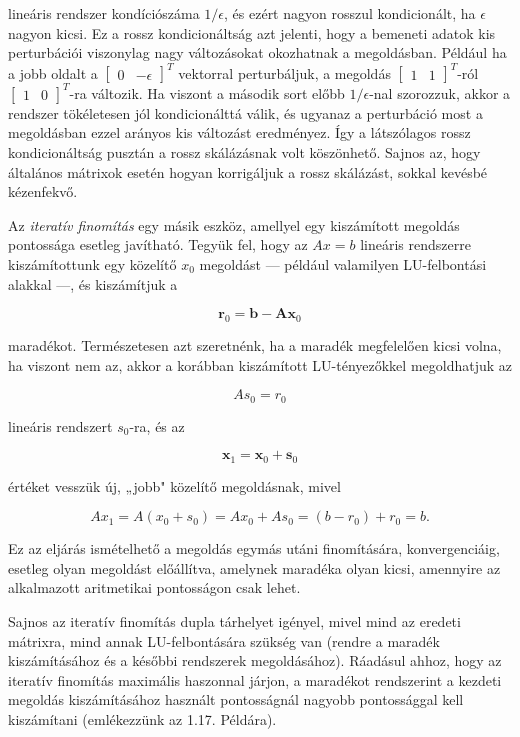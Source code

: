 \documentclass[
  magyar,
  11pt]{article}
\providecommand{\boldsymbol}[1]{\mathbf{#1}}
\begin{document}
lineáris rendszer kondíciószáma \(1/\epsilon\), és ezért nagyon rosszul
kondicionált, ha \(\epsilon\) nagyon kicsi. Ez a rossz kondicionáltság
azt jelenti, hogy a bemeneti adatok kis perturbációi viszonylag nagy
változásokat okozhatnak a megoldásban. Például ha a jobb oldalt a
\(\begin{bmatrix} 0 & -\epsilon \end{bmatrix}^T\) vektorral
perturbáljuk, a megoldás \(\begin{bmatrix} 1 & 1 \end{bmatrix}^T\)-ról
\(\begin{bmatrix} 1 & 0 \end{bmatrix}^T\)-ra változik. Ha viszont a
második sort előbb \(1/\epsilon\)-nal szorozzuk, akkor a rendszer
tökéletesen jól kondicionálttá válik, és ugyanaz a perturbáció most a
megoldásban ezzel arányos kis változást eredményez. Így a látszólagos
rossz kondicionáltság pusztán a rossz skálázásnak volt köszönhető.
Sajnos az, hogy általános mátrixok esetén hogyan korrigáljuk a rossz
skálázást, sokkal kevésbé kézenfekvő.

Az \emph{iteratív finomítás} egy másik eszköz, amellyel egy kiszámított
megoldás pontossága esetleg javítható. Tegyük fel, hogy az \(Ax = b\)
lineáris rendszerre kiszámítottunk egy közelítő \(x_0\) megoldást ---
például valamilyen LU-felbontási alakkal ---, és kiszámítjuk a

\[\boldsymbol{r}_0 = \boldsymbol{b} - \boldsymbol{A}\boldsymbol{x}_0\]

maradékot. Természetesen azt szeretnénk, ha a maradék megfelelően kicsi
volna, ha viszont nem az, akkor a korábban kiszámított LU-tényezőkkel
megoldhatjuk az

\[As_0 = r_0\]

lineáris rendszert \(s_0\)-ra, és az

\[\boldsymbol{x}_1 = \boldsymbol{x}_0 + \boldsymbol{s}_0\]

értéket vesszük új, „jobb" közelítő megoldásnak, mivel

\[Ax_1 = A(x_0 + s_0) = Ax_0 + As_0 = (b - r_0) + r_0 = b.\]

Ez az eljárás ismételhető a megoldás egymás utáni finomítására,
konvergenciáig, esetleg olyan megoldást előállítva, amelynek maradéka
olyan kicsi, amennyire az alkalmazott aritmetikai pontosságon csak
lehet.

Sajnos az iteratív finomítás dupla tárhelyet igényel, mivel mind az
eredeti mátrixra, mind annak LU-felbontására szükség van (rendre a
maradék kiszámításához és a későbbi rendszerek megoldásához). Ráadásul
ahhoz, hogy az iteratív finomítás maximális haszonnal járjon, a
maradékot rendszerint a kezdeti megoldás kiszámításához használt
pontosságnál nagyobb pontossággal kell kiszámítani (emlékezzünk az 1.17.
Példára).
\end{document}
